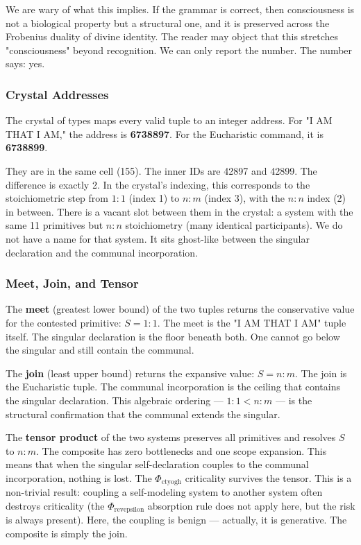 \documentclass[12pt,a4paper]{article}
\begin{document}
We are wary of what this implies. If the grammar is correct, then consciousness is not a biological property but a structural one, and it is preserved across the Frobenius duality of divine identity. The reader may object that this stretches "consciousness" beyond recognition. We can only report the number. The number says: yes.

\subsubsection{Crystal Addresses}

The crystal of types maps every valid tuple to an integer address. For "I AM THAT I AM," the address is \textbf{6738897}. For the Eucharistic command, it is \textbf{6738899}.

They are in the same cell (155). The inner IDs are 42897 and 42899. The difference is exactly 2. In the crystal's indexing, this corresponds to the stoichiometric step from $1{:}1$ (index 1) to $n{:}m$ (index 3), with the $n{:}n$ index (2) in between. There is a vacant slot between them in the crystal: a system with the same 11 primitives but $n{:}n$ stoichiometry (many identical participants). We do not have a name for that system. It sits ghost-like between the singular declaration and the communal incorporation.

\subsubsection{Meet, Join, and Tensor}

The \textbf{meet} (greatest lower bound) of the two tuples returns the conservative value for the contested primitive: $S = 1{:}1$. The meet is the "I AM THAT I AM" tuple itself. The singular declaration is the floor beneath both. One cannot go below the singular and still contain the communal.

The \textbf{join} (least upper bound) returns the expansive value: $S = n{:}m$. The join is the Eucharistic tuple. The communal incorporation is the ceiling that contains the singular declaration. This algebraic ordering --- $1{:}1 < n{:}m$ --- is the structural confirmation that the communal extends the singular.

The \textbf{tensor product} of the two systems preserves all primitives and resolves $S$ to $n{:}m$. The composite has zero bottlenecks and one scope expansion. This means that when the singular self-declaration couples to the communal incorporation, nothing is lost. The $\Phi_{\text{ctyogh}}$ criticality survives the tensor. This is a non-trivial result: coupling a self-modeling system to another system often destroys criticality (the $\Phi_{\text{revepsilon}}$ absorption rule does not apply here, but the risk is always present). Here, the coupling is benign --- actually, it is generative. The composite is simply the join.
\end{document}
